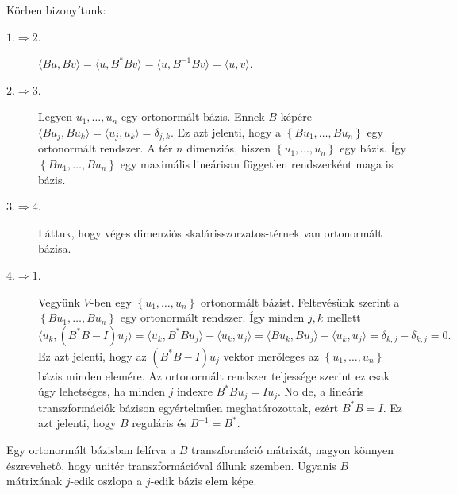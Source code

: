 \documentclass[a4paper, showtrims]{memoir}
\makeatletter
\renewenvironment{proof}[1][\proofname]
    {\par\pushQED{\qed}%
    \normalfont \topsep6\p@\@plus6\p@\relax
    \trivlist
    \item[\hskip\labelsep
        \itshape
    #1\@addpunct{:}]\ignorespaces}
    {\popQED\endtrivlist\@endpefalse}
\theoremstyle{plain}
\theoremstyle{remark}
\theoremstyle{definition}
\newcommand{\ip}[2]{\langle#1,#2\rangle}
\makeatother
\begin{document}
\begin{proof}
	Körben bizonyítunk:
	\begin{description}
		\item[$1.\Rightarrow 2.$]
		      \begin{math}
			      \ip{Bu}{Bv}
			      =
			      \ip{u}{B^\ast Bv}
			      =
			      \ip{u}{B^{-1}Bv}
			      =
			      \ip{u}{v}.
		      \end{math}
		\item[$2.\Rightarrow 3.$]
		      Legyen $u_1,\ldots,u_n$ egy ortonormált bázis.
		      Ennek $B$ képére
		      \begin{math}
			      \ip{Bu_j}{Bu_k}
			      =
			      \ip{u_j}{u_k}
			      =\delta_{j,k}.
		      \end{math}
		      Ez azt jelenti, hogy a $\left\{ Bu_1,\ldots,Bu_n \right\}$ egy ortonormált rendszer.
		      A tér $n$ dimenziós, hiszen $\left\{ u_1,\ldots,u_n \right\}$ egy bázis.
		      Így
		      $\left\{ Bu_1,\ldots,Bu_n \right\}$ egy maximális lineárisan független rendszerként maga is bázis.
		\item[$3.\Rightarrow 4.$]
            Láttuk, hogy véges dimenziós skalárisszorzatos-térnek van ortonormált bázisa.
		\item[$4.\Rightarrow 1.$]
		      Vegyünk $V$-ben egy $\left\{ u_1,\ldots,u_n \right\}$ ortonormált bázist.
		      Feltevésünk szerint a $\left\{ Bu_1,\ldots,Bu_n \right\}$ egy ortonormált rendszer.
		      Így minden $j,k$ mellett
		      \begin{displaymath}
			      \ip{u_k}{\left( B^\ast B-I \right)u_j}
			      =
			      \ip{u_k}{B^\ast Bu_j}-\ip{u_k}{u_j}
			      =
			      \ip{Bu_k}{Bu_j}-\ip{u_k}{u_j}
			      =
			      \delta_{k,j}-\delta_{k,j}
			      =
			      0.
		      \end{displaymath}
		      Ez azt jelenti, hogy az $(B^\ast B-I)u_j$ vektor merőleges az $\left\{ u_1,\ldots,u_n \right\}$ bázis minden elemére.
		      Az ortonormált rendszer teljessége szerint ez csak úgy lehetséges, ha minden $j$ indexre $B^\ast Bu_j=Iu_j$.
		      No de, a lineáris transzformációk bázison egyértelműen meghatározottak,
		      ezért $B^\ast B=I$.
		      Ez azt jelenti, hogy $B$ reguláris és $B^{-1}=B^\ast$.
              \qedhere
	\end{description}
\end{proof}
Egy ortonormált bázisban felírva a $B$ transzformáció mátrixát,
nagyon könnyen észrevehető, hogy unitér transzformációval állunk szemben.
Ugyanis $B$ mátrixának $j$-edik oszlopa a $j$-edik bázis elem képe.
\end{document}
